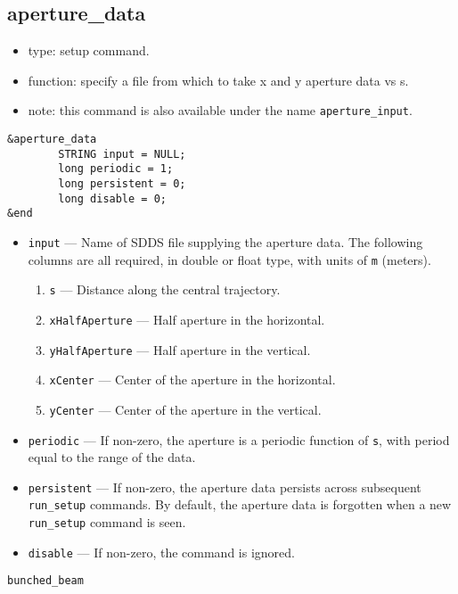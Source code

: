\documentclass[11pt]{article}
\begin{document}
\subsection{aperture\_data \label{subsec:aperturedata}}

\begin{itemize}
\item type: setup command.
\item function: specify a file from which to take x and y aperture data vs s.
\item note: this command is also available under the name \verb|aperture_input|.
\end{itemize}

\begin{verbatim}
&aperture_data
        STRING input = NULL;
        long periodic = 1; 
        long persistent = 0;
        long disable = 0;
&end
\end{verbatim}

\begin{itemize}
\item \verb|input| --- Name of SDDS file supplying the aperture data.  The following columns are
  all required, in double or float type, with units of \verb|m| (meters).
  \begin{enumerate}
    \item \verb|s| --- Distance along the central trajectory.  
    \item \verb|xHalfAperture| --- Half aperture in the horizontal. 
    \item \verb|yHalfAperture| --- Half aperture in the vertical.
    \item \verb|xCenter| --- Center of the aperture in the horizontal.
    \item \verb|yCenter| --- Center of the aperture in the vertical.
  \end{enumerate}
\item \verb|periodic| --- If non-zero, the aperture is a periodic function of \verb|s|, with period equal
  to the range of the data.
\item \verb|persistent| --- If non-zero, the aperture data persists across subsequent \verb|run_setup| commands.
  By default, the aperture data is forgotten when a new \verb|run_setup| command is seen.
\item \verb|disable| --- If non-zero, the command is ignored.
\end{itemize}

\begin{latexonly}
\newpage
\begin{center}{\Large\verb|bunched_beam|}\end{center}
\end{latexonly}
\end{document}
